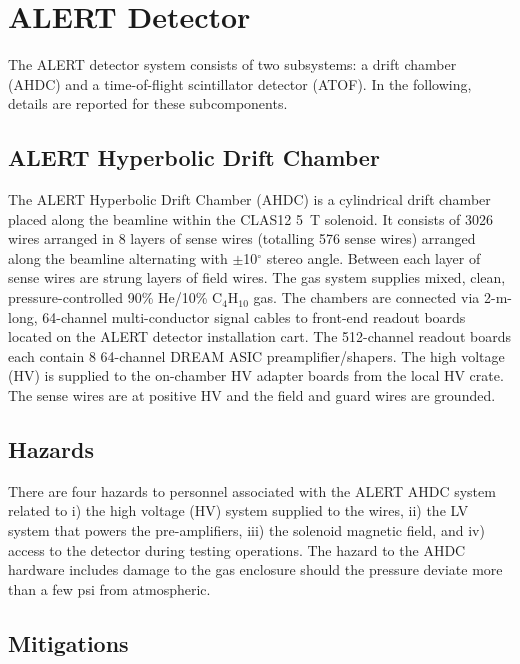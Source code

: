 \section{ALERT Detector}

The ALERT detector system consists of two subsystems: a drift chamber (AHDC) and a time-of-flight
scintillator detector (ATOF). In the following, details are reported for these subcomponents.

\subsection{ALERT Hyperbolic Drift Chamber}

The ALERT Hyperbolic Drift Chamber (AHDC) is a cylindrical drift chamber placed along the beamline
within the CLAS12 5~T solenoid. It consists of 3026 wires arranged in 8 layers of sense wires (totalling
576 sense wires) arranged along the beamline alternating with $\pm$10$^\circ$ stereo angle. Between
each layer of sense wires are strung layers of field wires. The gas system supplies mixed, clean,
pressure-controlled 90\% He/10\% C$_4$H$_{10}$ gas. The chambers are connected via 2-m-long, 64-channel
multi-conductor signal cables to front-end readout boards located on the ALERT detector installation
cart. The 512-channel readout boards each contain 8 64-channel DREAM ASIC preamplifier/shapers. The
high voltage (HV) is supplied to the on-chamber HV adapter boards from the local HV crate. The sense
wires are at positive HV and the field and guard wires are grounded.

\subsection{Hazards} 

There are four hazards to personnel associated with the ALERT AHDC system related to i) the high
voltage (HV) system supplied to the wires, ii) the LV system that powers the pre-amplifiers,
iii) the solenoid magnetic field, and iv) access to the detector during testing operations. The
hazard to the AHDC hardware includes damage to the gas enclosure should the pressure deviate more
than a few psi from atmospheric. 

\subsection{Mitigations}

